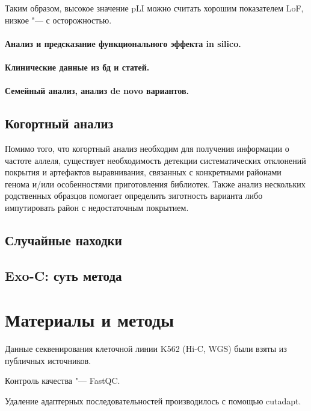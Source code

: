 \documentclass[a4paper,12pt]{article}
\begin{document}
Таким образом, высокое значение pLI можно считать хорошим показателем LoF, низкое "--- с осторожностью.

\paragraph{Анализ и предсказание функционального эффекта in silico.}

\paragraph{Клинические данные из бд и статей.}

\paragraph{Семейный анализ, анализ de novo вариантов.}

\subsection{Когортный анализ}

Помимо того, что когортный анализ необходим для получения информации о частоте аллеля, существует необходимость детекции систематических отклонений покрытия и артефактов выравнивания, связанных с конкретными районами генома и/или особенностями приготовления библиотек. Также анализ нескольких родственных образцов помогает определить зиготность варианта либо импутировать район с недостаточным покрытием.

\subsection{Случайные находки}

\subsection{Exo-C: суть метода}

\section{Материалы и методы}

Данные секвенирования клеточной линии K562 (Hi-C\cite{rao}, WGS\cite{zhou}\cite{dixon}) были взяты из публичных источников.

Контроль качества "--- FastQC\cite{fastqc}.

Удаление адаптерных последовательностей производилось с помощью cutadapt\cite{cutadapt}.
\end{document}
